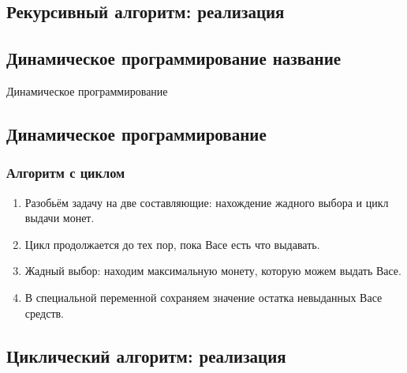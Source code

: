 \documentclass[compress,red]{beamer}
\begin{document}
\subsection{Рекурсивный алгоритм: реализация}
\begin{frame}[fragile]
  \frametitle{Реализация рекурсии}
  \scriptsize{
  \begin{lstlisting}[label=ruby1,language=ruby,caption=Монеты рекурсией]
		def give_coin(coins, n)
		  if coins.include?(n)
		    puts n
		  else
		    max = coins.find_all{|elem| elem < n}.max
		    puts max
		    give_coin(coins, n-max)
		  end
		end

		coins = [1,2,5,10,20,50,100]
		n = 398 
		give_coin(coin, n)
  \end{lstlisting}}}
  
\end{frame}

\subsection{Динамическое программирование название}
\begin{frame}
	\begin{center}
	\Huge{Динамическое программирование}
	\end{center}
\end{frame}

\subsection{Динамическое программирование}
\begin{frame}[fragile]
  \frametitle{Алгоритм с циклом}
	\begin{enumerate}
		\item Разобьём задачу на две составляющие: нахождение жадного выбора и цикл выдачи монет.
		\item Цикл продолжается до тех пор, пока Васе есть что выдавать.
		\item Жадный выбор: находим максимальную монету, которую можем выдать Васе.
		\item В специальной переменной сохраняем значение остатка невыданных Васе средств.
	\end{enumerate}
\end{frame}

\subsection{Циклический алгоритм: реализация}
\begin{frame}[fragile]
  \frametitle{Реализация циклом}
  \scriptsize{
  \begin{lstlisting}[label=ruby2,language=ruby,caption=Монеты циклом]
		coins = [1,2,5,10,20,50,100]
		n = 48 

		while (n != 0)
		  max = coins.find_all{|elem| elem<=n}.max
		  puts max
		  n = n - max
		end
  \end{lstlisting}}}
  
\end{frame}
\end{document}
